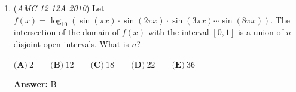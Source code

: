 \begin{enumerate}
 By Euler's Theorem, we have $\frac{-1}{2^{21}} \equiv -13^{21} \equiv -13^{\phi{(25)}}\cdot 13 \equiv -13 \equiv 12 \text{ } \text{ (mod } 25 \text{)}$

 Thus, we want to solve $x \equiv 12 \text{ } \text{ (mod } 25 \text{)}$ and $x \equiv 0 \text{ } \text{ (mod } 4 \text{)}$. An obvious solution is $x\equiv 12$ and by Chinese Remainder Theorem, we have $x\equiv 12$ is the only solution. So thus, $\frac{90!}{10^{21}} \equiv \boxed{12} \text{ } \text{ (mod } 100 \text{)}$

 \textbf{Remark (Chinese Remainder Theorem)} Both solution 1 and solution 2 rely on $n \equiv 12 (\bmod { \quad 25})$, $n \equiv 0 (\bmod { \quad 4})$ to get $n (\bmod { \quad 100})$

 By \href{https://artofproblemsolving.com/wiki/index.php/Chinese\_Remainder\_Theorem}{Chinese Remainder Theorem}, the general solution of the system of $2$ linear congruences is:

 \begin{verbatim}
$n \equiv r_1 (\bmod { \quad m_1})$, $n \equiv r_2 (\bmod { \quad m_2})$, $(m_1, m_2) = 1$Find $k_1$ and $k_2$ such that $k_1 m_1 \equiv 1 (\bmod{ \quad m_2})$, $k_2 m_2 \equiv 1 (\bmod{ \quad m_1})$Then $n \equiv k_2 m_2 r_1 + k_1 m_1 r_2 (\bmod{ \quad m_1 m_2})$
\end{verbatim}

In this problem, $n \equiv 12 (\bmod { \quad 25})$, $n \equiv 0 (\bmod { \quad 4})$:

 \begin{verbatim}
$n \equiv 12 (\bmod{ \quad 25})$, $n \equiv 0 (\bmod{ \quad 4})$, $(25, 4) = 1$$1 \cdot 25 \equiv 1 (\bmod{ \quad 4})$, $19 \cdot 4 \equiv 1 (\bmod{ \quad 25})$Then $n \equiv 19 \cdot 4 \cdot 12 + 1 \cdot 25 \cdot 0 \equiv 12 (\bmod{ \quad 100})$
\end{verbatim}




	\item (\textit{AMC 12 12A 2010}) Let $f(x) = \log_{10} \left(\sin(\pi x) \cdot \sin(2 \pi x) \cdot \sin (3 \pi x) \cdots \sin(8 \pi x)\right)$. The intersection of the domain of $f(x)$ with the interval $[0,1]$ is a union of $n$ disjoint open intervals. What is $n$?


 $\textbf{(A)}\ 2 \qquad \textbf{(B)}\ 12 \qquad \textbf{(C)}\ 18 \qquad \textbf{(D)}\ 22 \qquad \textbf{(E)}\ 36$

 \textbf{Answer: }B




\end{enumerate}
